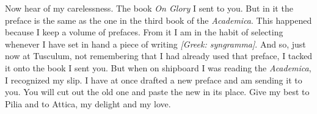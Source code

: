  Now hear of my carelessness. The book \textit{On Glory} I sent to you. But in it the preface is the same as the one in the third book of the \textit{Academica}. This happened because I keep a volume of prefaces. From it I am in the habit of selecting whenever I have set in hand a piece of writing \textit{[Greek: syngramma]}. And so, just now at Tusculum, not remembering that I had already used that preface, I tacked it onto the book I sent you. But when on shipboard I was reading the \textit{Academica}, I recognized my slip. I have at once drafted a new preface and am sending it to you. You will cut out the old one and paste the new in its place. Give my best to Pilia and to Attica, my delight and my love.
